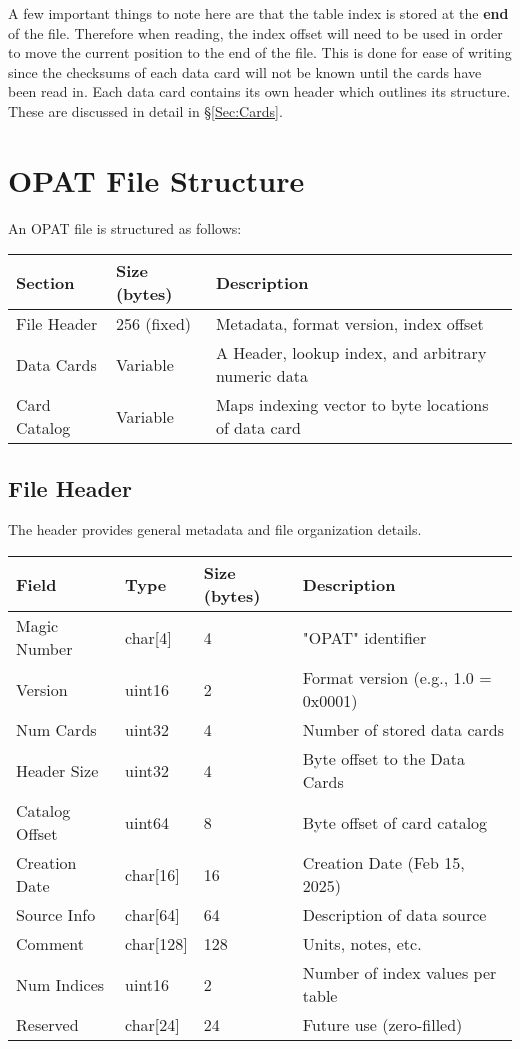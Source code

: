 \documentclass{article}
\begin{document}
\noindent A few important things to note here are that the table index is
stored at the \textbf{end} of the file.  Therefore when reading, the index
offset will need to be used in order to move the current position to the end of
the file.  This is done for ease of writing since the checksums of each data
card will not be known until the cards have been read in.  Each data card contains
its own header which outlines its structure.  These are discussed in detail in
\S \ref{Sec:Cards}. 

\section{OPAT File Structure}
An OPAT file is structured as follows:

\begin{center}
\begin{tabular}{|l|l|l|}
\hline
\textbf{Section} & \textbf{Size (bytes)} & \textbf{Description} \\
\hline
File Header & 256 (fixed) & Metadata, format version, index offset \\
Data Cards & Variable & A Header, lookup index, and arbitrary numeric data \\
Card Catalog & Variable & Maps indexing vector to byte locations of data card\\
\hline
\end{tabular}
\end{center}

\subsection{File Header}
The header provides general metadata and file organization details.
\begin{longtable}{|l|l|l|l|}
\hline
\textbf{Field} & \textbf{Type} & \textbf{Size (bytes)} & \textbf{Description} \\
\hline
Magic Number & char[4] & 4 & "OPAT" identifier \\
Version & uint16 & 2 & Format version (e.g., 1.0 = 0x0001) \\
Num Cards & uint32 & 4 & Number of stored data cards \\
Header Size & uint32 & 4 & Byte offset to the Data Cards \\
Catalog Offset & uint64 & 8 & Byte offset of card catalog \\
Creation Date & char[16] & 16 & Creation Date (Feb 15, 2025) \\
Source Info & char[64] & 64 & Description of data source \\
Comment & char[128] & 128 & Units, notes, etc. \\
Num Indices & uint16 & 2 & Number of index values per table \\
Reserved & char[24] & 24 & Future use (zero-filled) \\
\hline
\end{longtable} 
\end{document}
